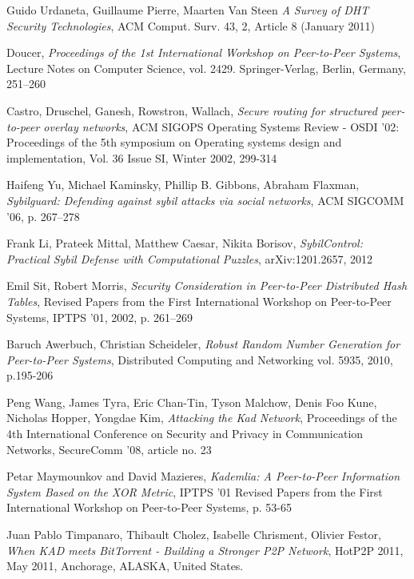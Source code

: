\begin{thebibliography}{99}

 Guido Urdaneta, Guillaume Pierre, Maarten Van Steen
\textit{A Survey of DHT Security Technologies}, ACM Comput. Surv.  43, 2,
Article 8 (January 2011)

 Doucer, \textit{Proceedings of the 1st International
Workshop on Peer-to-Peer Systems}, Lecture Notes on Computer Science, vol. 2429.
Springer-Verlag, Berlin, Germany, 251–260

 Castro, Druschel, Ganesh, Rowstron, Wallach,
\textit{Secure routing for structured peer-to-peer overlay networks},
ACM SIGOPS Operating Systems Review - OSDI '02: Proceedings of the 5th symposium
on Operating systems design and implementation,
Vol. 36 Issue SI, Winter 2002,
299-314

Haifeng Yu, Michael Kaminsky, Phillip B. Gibbons, Abraham Flaxman,
\textit{Sybilguard: Defending against sybil attacks via social networks},
ACM SIGCOMM ’06, p. 267--278

Frank Li, Prateek Mittal, Matthew Caesar, Nikita Borisov,
\textit{SybilControl: Practical Sybil Defense with Computational Puzzles},
arXiv:1201.2657, 2012

Emil Sit, Robert Morris,
\textit{Security Consideration in Peer-to-Peer Distributed Hash Tables},
Revised Papers from the First International Workshop on Peer-to-Peer Systems,
IPTPS '01, 2002, p. 261--269

Baruch Awerbuch, Christian Scheideler,
\textit{Robust Random Number Generation for Peer-to-Peer Systems},
Distributed Computing and Networking vol. 5935, 2010, p.195-206

Peng Wang, James Tyra, Eric Chan-Tin, Tyson Malchow, Denis Foo Kune, Nicholas
Hopper, Yongdae Kim,
\textit{Attacking the Kad Network},
Proceedings of the 4th International Conference on Security and Privacy in
Communication Networks, SecureComm '08, article no. 23

Petar Maymounkov and David Mazieres,
\textit{Kademlia: A Peer-to-Peer Information System Based on the XOR Metric},
IPTPS '01 Revised Papers from the First International Workshop on Peer-to-Peer
Systems, p. 53-65

Juan Pablo Timpanaro, Thibault Cholez, Isabelle Chrisment, Olivier Festor,
\textit{When KAD meets BitTorrent - Building a Stronger P2P Network},
HotP2P 2011, May 2011, Anchorage, ALASKA, United States.

\end{thebibliography}
